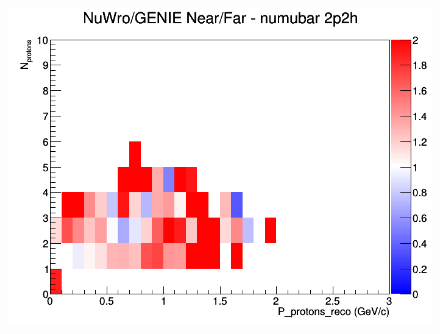 \documentclass[12pt]{article}
\begin{document}
\begin{figure}[h]
\endminipage
{}
\includegraphics[width=\linewidth]{eff_N_P/FGT/protons/ratios/2p2h_NuWro_GENIE_numubar_NF_N_P.png}
\endminipage
\newline
\end{figure}
\clearpage
\end{document}
